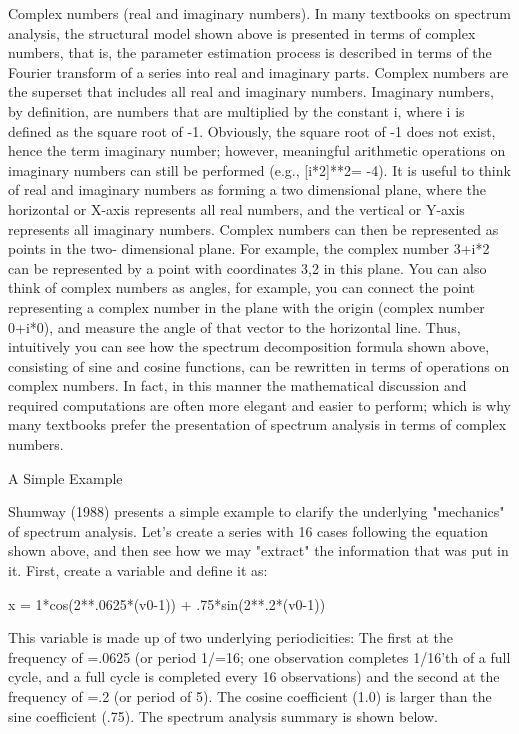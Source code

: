 Complex numbers (real and imaginary numbers). In many textbooks on spectrum analysis, the structural model shown above is presented in terms of complex numbers, that is, the parameter estimation process is described in terms of the Fourier transform of a series into real and imaginary parts. Complex numbers are the superset that includes all real and imaginary numbers. Imaginary numbers, by definition, are numbers that are multiplied by the constant i, where i is defined as the square root of -1. Obviously, the square root of -1 does not exist, hence the term imaginary number; however, meaningful arithmetic operations on imaginary numbers can still be performed (e.g., [i*2]**2= -4). It is useful to think of real and imaginary numbers as forming a two dimensional plane, where the horizontal or X-axis represents all real numbers, and the vertical or Y-axis represents all imaginary numbers. Complex numbers can then be represented as points in the two- dimensional plane. For example, the complex number 3+i*2 can be represented by a point with coordinates {3,2} in this plane. You can also think of complex numbers as angles, for example, you can connect the point representing a complex number in the plane with the origin (complex number 0+i*0), and measure the angle of that vector to the horizontal line. Thus, intuitively you can see how the spectrum decomposition formula shown above, consisting of sine and cosine functions, can be rewritten in terms of operations on complex numbers. In fact, in this manner the mathematical discussion and required computations are often more elegant and easier to perform; which is why many textbooks prefer the presentation of spectrum analysis in terms of complex numbers.

A Simple Example

Shumway (1988) presents a simple example to clarify the underlying "mechanics" of spectrum analysis. Let's create a series with 16 cases following the equation shown above, and then see how we may "extract" the information that was put in it. First, create a variable and define it as:

x = 1*cos(2**.0625*(v0-1)) + .75*sin(2**.2*(v0-1))

This variable is made up of two underlying periodicities: The first at the frequency of =.0625 (or period 1/=16; one observation completes 1/16'th of a full cycle, and a full cycle is completed every 16 observations) and the second at the frequency of =.2 (or period of 5). The cosine coefficient (1.0) is larger than the sine coefficient (.75). The spectrum analysis summary is shown below.














